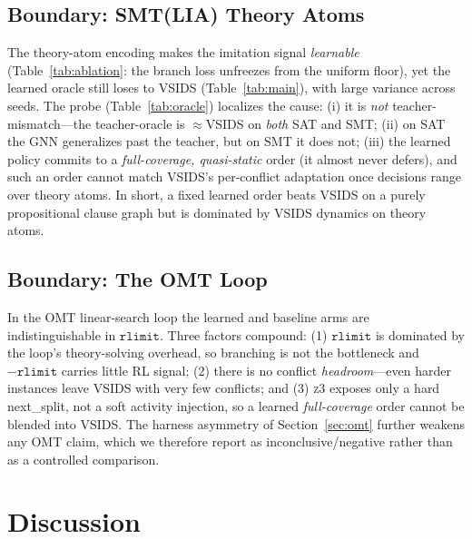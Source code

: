 \documentclass[letterpaper]{article} %
\theoremstyle{definition}
\theoremstyle{plain}
\theoremstyle{remark}
\newcommand{\solver}{\textsc{z3}}
\newcommand{\nextsplit}{\textsf{next\_split}}
\newcommand{\rlimit}{\texttt{rlimit}}
\begin{document}
\subsection{Boundary: SMT(LIA) Theory Atoms}
The theory-atom encoding makes the imitation signal \emph{learnable}
(Table~\ref{tab:ablation}: the branch loss unfreezes from the uniform floor),
yet the learned oracle still loses to VSIDS (Table~\ref{tab:main}), with
large variance across seeds. The probe (Table~\ref{tab:oracle}) localizes the
cause: (i) it is \emph{not} teacher-mismatch---the teacher-oracle is
$\approx$VSIDS on \emph{both} SAT and SMT; (ii) on SAT the GNN generalizes
past the teacher, but on SMT it does not; (iii) the learned policy commits to
a \emph{full-coverage, quasi-static} order (it almost never defers), and such
an order cannot match VSIDS's per-conflict adaptation once decisions range
over theory atoms. In short, a fixed learned order beats VSIDS on a
purely propositional clause graph but is dominated by VSIDS dynamics on
theory atoms.

\subsection{Boundary: The OMT Loop}
In the OMT linear-search loop the learned and baseline arms are
indistinguishable in $\rlimit$. Three factors compound: (1) $\rlimit$ is
dominated by the loop's theory-solving overhead, so branching is not the
bottleneck and $-\rlimit$ carries little RL signal; (2) there is no
conflict \emph{headroom}---even harder instances leave VSIDS with very few
conflicts; and (3) \solver{} exposes only a hard \nextsplit{}, not a soft
activity injection, so a learned \emph{full-coverage} order cannot be blended
into VSIDS. The harness asymmetry of Section~\ref{sec:omt} further weakens any
OMT claim, which we therefore report as inconclusive/negative rather than as
a controlled comparison.

\section{Discussion}
\label{sec:discussion}
\end{document}
